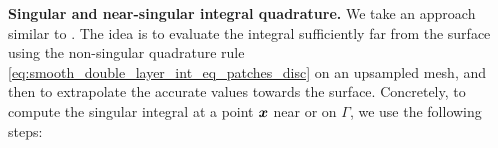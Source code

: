 \textbf{Singular and near-singular integral quadrature. }
We take an approach similar to \cite{klockner2013quadrature}.
The idea is to evaluate the integral sufficiently far from the surface using the non-singular quadrature rule
\eqref{eq:smooth_double_layer_int_eq_patches_disc} on an upsampled mesh, and then
to extrapolate the accurate values towards the surface.
%
Concretely, to compute the singular integral at a point ${\bm{x}}$ near or on
$\Gamma$, we use the following steps:
